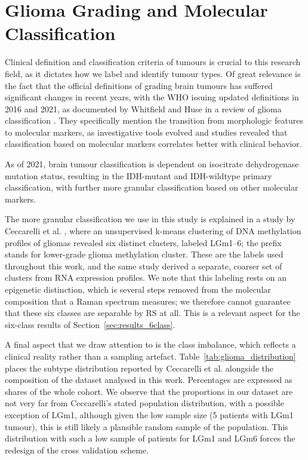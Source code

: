 \section{Glioma Grading and Molecular Classification}
\label{sec:glioma_grading}

Clinical definition and classification criteria of tumours is crucial to this research field, as it dictates how we label and identify tumour types. Of great relevance is the fact that the official definitions of grading brain tumours has suffered significant changes in recent years, with the WHO issuing updated definitions in 2016 and 2021, as documented by Whitfield and Huse in a review of glioma classification \cite{whitfield2022classificationgliomas}. They specifically mention the transition from morphologic features to molecular markers, as investigative tools evolved and studies revealed that classification based on molecular markers correlates better with clinical behavior. 

As of 2021, brain tumour classification is dependent on isocitrate dehydrogenase mutation status, resulting in the IDH-mutant and IDH-wildtype primary classification, with further more granular classification based on other molecular markers.

The more granular classification we use in this study is explained in a study by Ceccarelli et al. \cite{Ceccarelli2016}, where an unsupervised k-means clustering of DNA methylation profiles of gliomas revealed six distinct clusters, labeled LGm1--6; the prefix stands for lower-grade glioma methylation cluster. These are the labels used throughout this work, and the same study derived a separate, coarser set of clusters from RNA expression profiles. We note that this labeling rests on an epigenetic distinction, which is several steps removed from the molecular composition that a Raman spectrum measures; we therefore cannot guarantee that these six classes are separable by RS at all. This is a relevant aspect for the six-class results of Section~\ref{sec:results_6class}.


A final aspect that we draw attention to is the class imbalance, which reflects a clinical
reality rather than a sampling artefact. Table~\ref{tab:glioma_distribution} places the
subtype distribution reported by Ceccarelli et al. \cite{Ceccarelli2016} alongside the
composition of the dataset analysed in this work. Percentages are expressed as shares of the whole cohort. We observe that the proportions in our dataset are not very far from Ceccarelli's stated population distribution, with a possible exception of LGm1, although given the low sample size (5 patients with LGm1 tumour), this is still likely a plausible random sample of the population. This distribution with such a low sample of patients for LGm1 and LGm6 forces the redesign of the cross validation scheme.

